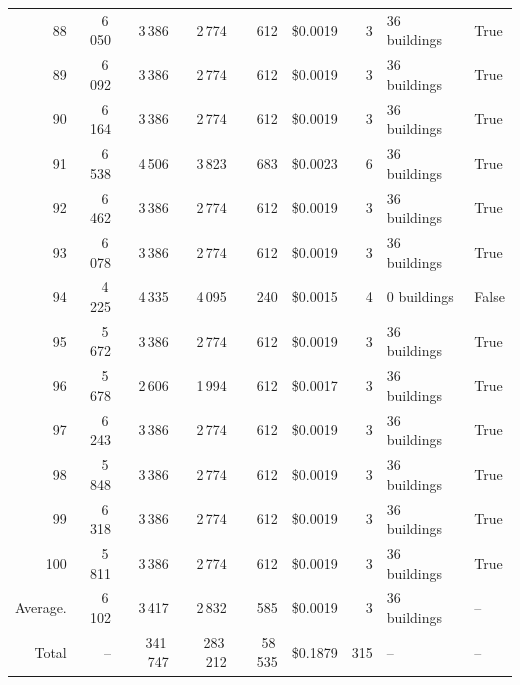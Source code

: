 \documentclass[a4paper,11pt]{article}
\begin{document}
\begin{table}[ht]
\begin{tabular}{r r r r r r r p{3cm} l}
88 & 6\,050 & 3\,386 & 2\,774 & 612 & \$0.0019 & 3 & 36 buildings & True \\
89 & 6\,092 & 3\,386 & 2\,774 & 612 & \$0.0019 & 3 & 36 buildings & True \\
90 & 6\,164 & 3\,386 & 2\,774 & 612 & \$0.0019 & 3 & 36 buildings & True \\
91 & 6\,538 & 4\,506 & 3\,823 & 683 & \$0.0023 & 6 & 36 buildings & True \\
92 & 6\,462 & 3\,386 & 2\,774 & 612 & \$0.0019 & 3 & 36 buildings & True \\
93 & 6\,078 & 3\,386 & 2\,774 & 612 & \$0.0019 & 3 & 36 buildings & True \\
94 & 4\,225 & 4\,335 & 4\,095 & 240 & \$0.0015 & 4 & 0 buildings & False \\
95 & 5\,672 & 3\,386 & 2\,774 & 612 & \$0.0019 & 3 & 36 buildings & True \\
96 & 5\,678 & 2\,606 & 1\,994 & 612 & \$0.0017 & 3 & 36 buildings & True \\
97 & 6\,243 & 3\,386 & 2\,774 & 612 & \$0.0019 & 3 & 36 buildings & True \\
98 & 5\,848 & 3\,386 & 2\,774 & 612 & \$0.0019 & 3 & 36 buildings & True \\
99 & 6\,318 & 3\,386 & 2\,774 & 612 & \$0.0019 & 3 & 36 buildings & True \\
100 & 5\,811 & 3\,386 & 2\,774 & 612 & \$0.0019 & 3 & 36 buildings & True \\
\hline
Average. & 6\,102 & 3\,417 & 2\,832 & 585 & \$0.0019 & 3 & 36 buildings & -- \\
Total & -- & 341\,747 & 283\,212 & 58\,535 & \$0.1879 & 315 & -- & -- \\
\hline
\end{tabular}
\end{table}

\clearpage
\end{document}
